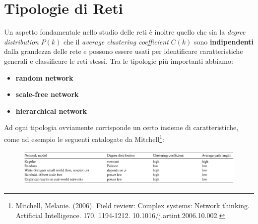 \documentclass[a4paper,12pt, oneside]{book}
\begin{document}
\section{Tipologie di Reti}
Un aspetto fondamentale nello studio delle reti è inoltre quello che sia la
\textit{degree distribution} $P(k)$ che il \textit{average clustering
  coefficient} $C(k)$ sono \textbf{indipendenti} dalla grandezza delle rete e
possono essere usati per identificare caratteristiche generali e classificare le
reti stessi. Tra le tipologie più importanti abbiamo:
\begin{itemize}
  \item \textbf{random network}
  \item \textbf{scale-free network}
  \item \textbf{hierarchical network}
\end{itemize}
Ad ogni tipologia ovviamente corrisponde un certo insieme di caratteristiche,
come ad esempio le seguenti catalogate da Mitchell\footnote{Mitchell,
  Melanie. (2006). Field review: Complex systems: Network thinking. Artificial
  Intelligence. 170. 1194-1212. 10.1016/j.artint.2006.10.002.}:
\begin{figure}[H]
  \centering
  \includegraphics[width = \textwidth]{img/net.jpg} 
\end{figure}
\newpage
\end{document}
